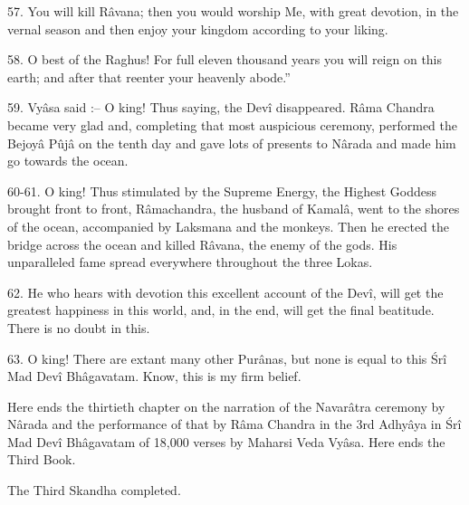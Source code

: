57. You will kill R\^avana; then you would worship Me, with great devotion, in the vernal season and then enjoy your kingdom according to your liking.

58. O best of the Raghus! For full eleven thousand years you will reign on this earth; and after that reenter your heavenly abode.''

59. Vy\^asa said :-- O king! Thus saying, the Dev\^i disappeared. R\^ama Chandra became very glad and, completing that most auspicious ceremony, performed the Bejoy\^a Pûj\^a on the tenth day and gave lots of presents to N\^arada and made him go towards the ocean.

60-61. O king! Thus stimulated by the Supreme Energy, the Highest Goddess brought front to front, R\^amachandra, the husband of Kamal\^a, went to the shores of the ocean, accompanied by Laksmana and the monkeys. Then he erected the bridge across the ocean and killed R\^avana, the enemy of the gods. His unparalleled fame spread everywhere throughout the three Lokas.

62. He who hears with devotion this excellent account of the Dev\^i, will get the greatest happiness in this world, and, in the end, will get the final beatitude. There is no doubt in this.

63. O king! There are extant many other Pur\^anas, but none is equal to this \'Sr\^i Mad Dev\^i Bh\^agavatam. Know, this is my firm belief.

Here ends the thirtieth chapter on the narration of the Navar\^atra ceremony by N\^arada and the performance of that by R\^ama Chandra in the 3rd Adhy\^aya in \'Sr\^i Mad Dev\^i Bh\^agavatam of 18,000 verses by Maharsi Veda Vy\^asa. Here ends the Third Book.

The Third Skandha completed.